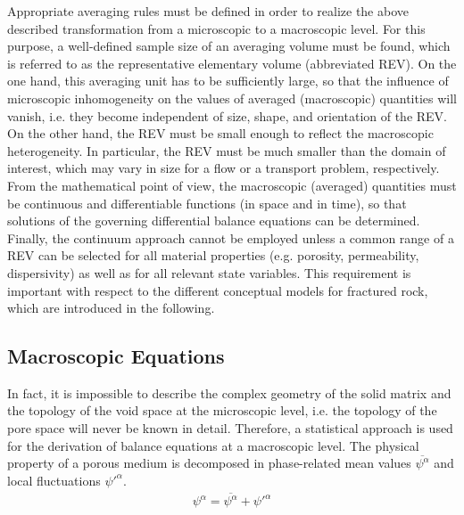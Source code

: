 Appropriate averaging rules must be defined in order to realize
the above described transformation from a microscopic to a
macroscopic level. For this purpose, a well-defined sample size of
an averaging volume must be found, which is referred to as the
representative elementary volume (abbreviated REV). On the one hand, this averaging
unit has to be sufficiently large, so that the influence of
microscopic inhomogeneity on the values of averaged (macroscopic)
quantities will vanish, i.e. they become independent of size,
shape, and orientation of the REV. On the other hand, the REV must
be small enough to reflect the macroscopic heterogeneity. In
particular, the REV must be much smaller than the domain of
interest, which may vary in size for a flow or a transport
problem, respectively. From the mathematical point of view, the
macroscopic (averaged) quantities must be continuous and
differentiable functions (in space and in time), so that solutions
of the governing differential balance equations can be determined.
Finally, the continuum approach cannot be employed unless a common
range of a REV can be selected for all material properties (e.g.
porosity, permeability, dispersivity) as well as for all relevant
state variables. This requirement is important with respect to the
different conceptual models for fractured rock, which are
introduced in the following.

\subsection{Macroscopic Equations}


In fact, it is impossible to describe the complex geometry of the solid matrix
and the topology of the void space at the microscopic level, i.e. the topology
of the pore space will never be known in detail. Therefore, a statistical
approach is used for the derivation of balance equations at a macroscopic
level. The physical property of a porous medium is decomposed in phase-related
mean values $\overline{\psi^\alpha}$ and local fluctuations ${\psi'}^\alpha$.
%
\begin{eqnarray}
\psi^\alpha
=
\overline{\psi^\alpha}
+
{\psi'}^\alpha
\end{eqnarray}


